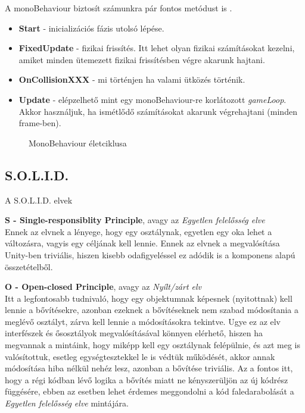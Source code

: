 A monoBehaviour biztosít számunkra pár fontos metódust is \cite{unityDocs}.
\begin{itemize}
	\item \textbf{Start} - inicializációs fázis utolsó lépése.
	\item \textbf{FixedUpdate} - fizikai frissítés. Itt lehet olyan fizikai számításokat kezelni, amiket minden ütemezett fizikai frissítésben végre akarunk hajtani.
	\item \textbf{OnCollisionXXX} - mi történjen ha valami ütközés történik.
	\item \textbf{Update} - elépzelhető mint egy monoBehaviour-re korlátozott \textit{gameLoop}. Akkor használjuk, ha ismétlődő számításokat akarunk végrehajtani (minden frame-ben).
\end{itemize}

\begin{figure}[H]
	\noindent{}
	\caption{MonoBehaviour életciklusa}
	\label{thdfT}
\end{figure}

\subsection{S.O.L.I.D.}
A S.O.L.I.D. elvek\cite{solid}

\textbf{S - Single-responsiblity Principle}, avagy az \textit{Egyetlen felelősség elve}\\
Ennek az elvnek a lényege, hogy egy osztálynak, egyetlen egy oka lehet a változásra, vagyis egy céljának kell lennie. Ennek az elvnek a megvalósítása Unity-ben triviális, hiszen kisebb odafigyeléssel ez adódik is a komponens alapú összetételből.

\textbf{O - Open-closed Principle}, avagy az \textit{Nyílt/zárt elv}\\
Itt a legfontosabb tudnivaló, hogy egy objektumnak képesnek (nyitottnak) kell lennie a bővítésekre, azonban ezeknek a bővítéseknek nem szabad módosítania a meglévő osztályt, zárva kell lennie a módosításokra tekintve. Ugye ez az elv interfészek és ősosztályok megvalósításával könnyen elérhető, hiszen ha megvannak a mintáink, hogy miképp kell egy osztálynak felépülnie, és azt meg is valósítottuk, esetleg egységtesztekkel le is védtük működését, akkor annak módosítása hiba nélkül nehéz lesz, azonban a bővítése triviális. Az a fontos itt, hogy a régi kódban lévő logika a bővítés miatt ne kényszerüljön az új kódrész függésére, ebben az esetben lehet érdemes meggondolni a kód faledarabolását a \textit{Egyetlen felelősség elve} mintájára.

